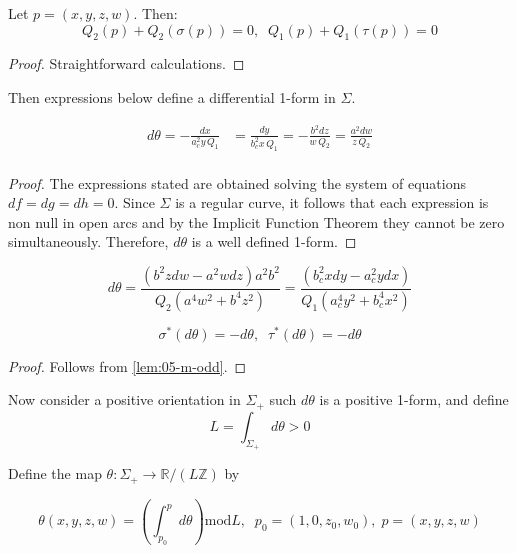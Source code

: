 \begin{lemma} Let $p=(x,y,z,w)$.
Then:
\[
       Q_2(p)+   Q_2(\sigma(p))=0,\;\;     Q_1(p)+   Q_1(\tau(p))=0
\]
\label{lem:05-m-odd}
\end{lemma}

\begin{proof} Straightforward calculations.
\end{proof}

\begin{proposition}
Then expressions below define a differential 1-form in $\Sigma.$

\begin{align*}
  d\theta=  -\frac{dx}{ a_c^2 y\,    Q_1}& =  \frac{dy}{b_c^2 x\,    Q_1}= -\frac{b^2dz}{w\,    Q_2}=\frac{a^2 dw}{z \,   Q_2}\\
\end{align*}
\label{prop:08-dtheta}
\end{proposition}

\begin{proof}
The expressions stated are obtained solving the system of equations $df=dg=dh=0$. Since $\Sigma$ is a regular curve, it follows that each expression is non null in open arcs and by the Implicit Function Theorem   they cannot be zero simultaneously. Therefore, $d\theta$ is a well defined 1-form.
\end{proof}
\begin{remark}
\[ d\theta=\frac{(  b^2   z dw  - a^2  w dz     )   a^2   b^2}{    Q_2   (a^4   w^2 + b^4   z^2)}=\frac{(b_c^2  x dy -a_c^2  y dx         )}{   Q_1   (a_c^4   y^2 + b_c^4   x^2)}
\]
\end{remark}
\begin{proposition}
\[ \sigma^{*}(d\theta)=-d\theta,\;\; \tau^{*}(d\theta)=-d\theta \]
\label{prop:05-invariant-measure}
\end{proposition}

\begin{proof} Follows from \cref{lem:05-m-odd}.
\end{proof}

Now consider a positive  orientation in $\Sigma_+$ such $d\theta$ is a positive 1-form, and define
\[ L=\int_{\Sigma_+ } d\theta >0\]

Define the map
$\theta:\Sigma_+\to \mathbb{R}/(L \mathbb{Z})$ by

\[\theta(x,y,z,w)=\left(\int_{p_0}^p d\theta\right) \text{mod} L ,\;\; p_0=(1,0,z_0,w_0),\; p=(x,y,z,w)\]


